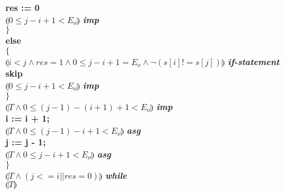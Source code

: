 \documentclass[12pt]{article}
\begin{document}
\hspace*{20mm}\textbf{res := 0} \\
\hspace*{20mm}$\limg 0 \leq j - i + 1 < E_o \rimg$ \textit{\textbf{imp}}\\
\hspace*{10mm}\textbf{$\}$} \\
\hspace*{10mm}\textbf{else} \\
\hspace*{10mm}\textbf{$\{$} \\
\hspace*{20mm}$\limg i < j  \land res = 1 \land 0 \leq j - i + 1 = E_o \land \neg(s[i] != s[j]) \rimg$ \textit{\textbf{if-statement}}\\
\hspace*{20mm}\textbf{skip} \\
\hspace*{20mm}$\limg 0 \leq j - i + 1 < E_o \rimg$ \textit{\textbf{imp}}\\
\hspace*{10mm}\textbf{$\}$} \\
\hspace*{10mm}$\limg T \land 0 \leq (j-1) - (i+1) + 1 < E_o \rimg$ \textit{\textbf{imp}}\\
\hspace*{10mm}\textbf{i := i + 1;} \\
\hspace*{10mm}$\limg T \land 0 \leq (j-1) - i + 1 < E_o \rimg$ \textit{\textbf{asg}}\\
\hspace*{10mm}\textbf{j := j - 1;} \\
\hspace*{10mm}$\limg T \land 0 \leq j - i + 1 < E_o \rimg$ \textit{\textbf{asg}}\\
\textbf{$\}$} \\
$\limg T \land (j <= i || res = 0) \rimg$ \textit{\textbf{while}}\\
$\limg T \rimg$
\newpage
\end{document}

